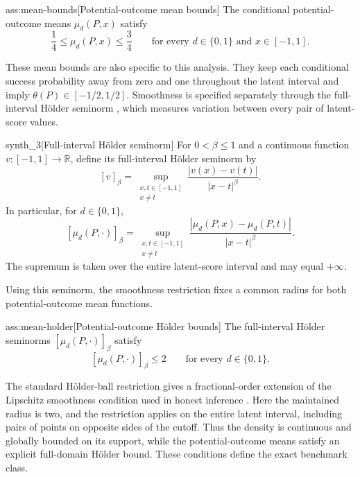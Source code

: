 \begin{assumptionv}{ass:mean-bounds}[Potential-outcome mean bounds]
The conditional potential-outcome means \(\mu_d(P,x)\) satisfy
\[
\frac14\le\mu_d(P,x)\le\frac34
\qquad\text{for every }d\in\{0,1\}\text{ and }x\in[-1,1].
\]
\end{assumptionv}

These mean bounds are also specific to this analysis. They keep each conditional success probability away from zero and one throughout the latent interval and imply \(\theta(P)\in[-1/2,1/2]\). Smoothness is specified separately through the full-interval Hölder seminorm , which measures variation between every pair of latent-score values.

\begin{definitionv}{synth_3}[Full-interval Hölder seminorm]
For \(0<\beta\le1\) and a continuous function \(v:[-1,1]\to\mathbb R\), define its full-interval Hölder seminorm by
\[
[v]_\beta
=
\sup_{\substack{x,t\in[-1,1]\\x\ne t}}
\frac{|v(x)-v(t)|}{|x-t|^\beta}.
\]
In particular, for \(d\in\{0,1\}\),
\[
[\mu_d(P,\cdot)]_\beta
=
\sup_{\substack{x,t\in[-1,1]\\x\ne t}}
\frac{|\mu_d(P,x)-\mu_d(P,t)|}{|x-t|^\beta}.
\]
The supremum is taken over the entire latent-score interval and may equal \(+\infty\).
\end{definitionv}

Using this seminorm, the smoothness restriction fixes a common radius for both potential-outcome mean functions.

\begin{assumptionv}{ass:mean-holder}[Potential-outcome Hölder bounds]
The full-interval Hölder seminorms \([\mu_d(P,\cdot)]_\beta\) satisfy
\[
[\mu_d(P,\cdot)]_\beta\le2
\qquad\text{for every }d\in\{0,1\}.
\]
\end{assumptionv}

The standard Hölder-ball restriction gives a fractional-order extension of the Lipschitz smoothness condition used in honest inference \citep{ArmstrongKolesar2020SimpleHonest}. Here the maintained radius is two, and the restriction applies on the entire latent interval, including pairs of points on opposite sides of the cutoff. Thus the density is continuous and globally bounded on its support, while the potential-outcome means satisfy an explicit full-domain Hölder bound. These conditions define the exact benchmark class.


